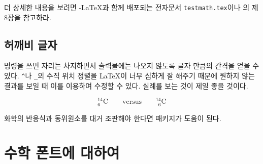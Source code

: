 더 상세한 내용을 보려면
\AmS-\LaTeX 과 함께 배포되는 전자문서 \texttt{testmath.tex}이나 \companion{}의 제8장을 
참고하라.

\subsection{허깨비 글자}

 명령을 쓰면 자리는 차지하면서 출력물에는 나오지 않도록 글자 만큼의 간격을 얻을 수 있다.
\verb|^|나 \verb|_|의 수직 위치 정렬을 \LaTeX 이 너무 심하게 잘 해주기 때문에 원하지 않는 결과를 
보일 때 이를 이용하여 수정할 수 있다. 실례를 보는 것이 제일 좋을 것이다.
\begin{example}
\begin{equation*}
{}^{14}_{6}\text{C}
\qquad \text{versus} \qquad
{}^{14}_{\phantom{1}6}\text{C}
\end{equation*}
\end{example}

화학의 반응식과 동위원소를 대거 조판해야 한다면  패키지가 도움이 된다.

\section{수학 폰트에 대하여}
\label{sec:fontsz}

